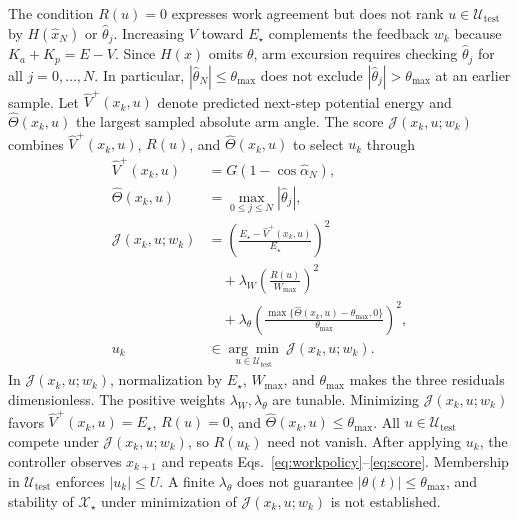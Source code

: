 \documentclass[letterpaper,10pt,conference]{ieeeconf}
\newcommand{\Estar}{E_{\star}}
\begin{document}
The condition $R(u)=0$ expresses work agreement but does not rank $u\in\mathcal U_{\mathrm{test}}$ by $H(\widehat x_N)$ or $\widehat\theta_j$. Increasing $V$ toward $\Estar$ complements the feedback $w_k$ because $K_a+K_p=E-V$. Since $H(x)$ omits $\theta$, arm excursion requires checking $\widehat\theta_j$ for all $j=0,\ldots,N$. In particular, $|\widehat\theta_N|\le\theta_{\max}$ does not exclude $|\widehat\theta_j|>\theta_{\max}$ at an earlier sample. Let $\widehat V^+(x_k,u)$ denote predicted next-step potential energy and $\widehat\Theta(x_k,u)$ the largest sampled absolute arm angle. The score $\mathcal J(x_k,u;w_k)$ combines $\widehat V^+(x_k,u)$, $R(u)$, and $\widehat\Theta(x_k,u)$ to select $u_k$ through
\begin{equation}
\begin{aligned}
 \widehat V^+(x_k,u)&=G(1-\cos\widehat\alpha_N),\\
 \widehat\Theta(x_k,u)&=\max_{0\le j\le N}|\widehat\theta_j|,\\
 \mathcal J(x_k,u;w_k)&=\left(\frac{\Estar-\widehat V^+(x_k,u)}{\Estar}\right)^2\\
 &\quad+\lambda_W\left(\frac{R(u)}{W_{\max}}\right)^2\\
 &\quad+\lambda_\theta\left(\frac{\max\{\widehat\Theta(x_k,u)-\theta_{\max},0\}}{\theta_{\max}}\right)^2,\\
 u_k&\in\underset{u\in\mathcal U_{\mathrm{test}}}{\arg\min}\ \mathcal J(x_k,u;w_k).
\end{aligned}
\label{eq:score}
\end{equation}
In $\mathcal J(x_k,u;w_k)$, normalization by $\Estar$, $W_{\max}$, and $\theta_{\max}$ makes the three residuals dimensionless. The positive weights $\lambda_W,\lambda_\theta$ are tunable. Minimizing $\mathcal J(x_k,u;w_k)$ favors $\widehat V^+(x_k,u)=\Estar$, $R(u)=0$, and $\widehat\Theta(x_k,u)\le\theta_{\max}$. All $u\in\mathcal U_{\mathrm{test}}$ compete under $\mathcal J(x_k,u;w_k)$, so $R(u_k)$ need not vanish. After applying $u_k$, the controller observes $x_{k+1}$ and repeats Eqs.~\eqref{eq:workpolicy}--\eqref{eq:score}. Membership in $\mathcal U_{\mathrm{test}}$ enforces $|u_k|\le U$. A finite $\lambda_\theta$ does not guarantee $|\theta(t)|\le\theta_{\max}$, and stability of $\mathcal X_\star$ under minimization of $\mathcal J(x_k,u;w_k)$ is not established.
\end{document}
